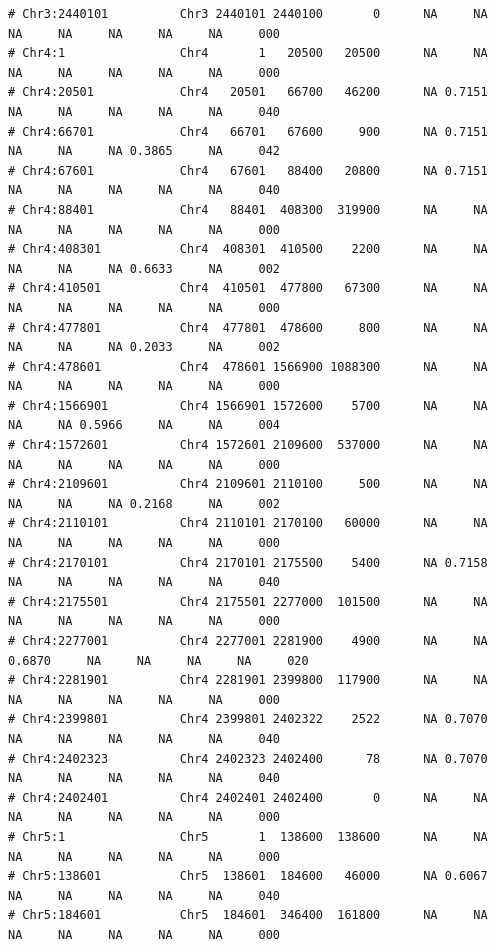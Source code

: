 \documentclass{article}\usepackage[]{graphicx}\usepackage[]{color}
\makeatletter
\newenvironment{kframe}{%
 \def\at@end@of@kframe{}%
 \ifinner\ifhmode%
  \def\at@end@of@kframe{\end{minipage}}%
  \begin{minipage}{\columnwidth}%
 \fi\fi%
 \def\FrameCommand##1{\hskip\@totalleftmargin \hskip-\fboxsep
 \colorbox{shadecolor}{##1}\hskip-\fboxsep
     \hskip-\linewidth \hskip-\@totalleftmargin \hskip\columnwidth}%
 \MakeFramed {\advance\hsize-\width
   \@totalleftmargin\z@ \linewidth\hsize
   \@setminipage}}%
 {\par\unskip\endMakeFramed%
 \at@end@of@kframe}
\newenvironment{knitrout}{}{} %
\makeatother
\begin{document}
\begin{knitrout}
\begin{kframe}
\begin{verbatim}
# Chr3:2440101          Chr3 2440101 2440100       0      NA     NA     NA     NA     NA     NA     NA     000
# Chr4:1                Chr4       1   20500   20500      NA     NA     NA     NA     NA     NA     NA     000
# Chr4:20501            Chr4   20501   66700   46200      NA 0.7151     NA     NA     NA     NA     NA     040
# Chr4:66701            Chr4   66701   67600     900      NA 0.7151     NA     NA     NA 0.3865     NA     042
# Chr4:67601            Chr4   67601   88400   20800      NA 0.7151     NA     NA     NA     NA     NA     040
# Chr4:88401            Chr4   88401  408300  319900      NA     NA     NA     NA     NA     NA     NA     000
# Chr4:408301           Chr4  408301  410500    2200      NA     NA     NA     NA     NA 0.6633     NA     002
# Chr4:410501           Chr4  410501  477800   67300      NA     NA     NA     NA     NA     NA     NA     000
# Chr4:477801           Chr4  477801  478600     800      NA     NA     NA     NA     NA 0.2033     NA     002
# Chr4:478601           Chr4  478601 1566900 1088300      NA     NA     NA     NA     NA     NA     NA     000
# Chr4:1566901          Chr4 1566901 1572600    5700      NA     NA     NA     NA 0.5966     NA     NA     004
# Chr4:1572601          Chr4 1572601 2109600  537000      NA     NA     NA     NA     NA     NA     NA     000
# Chr4:2109601          Chr4 2109601 2110100     500      NA     NA     NA     NA     NA 0.2168     NA     002
# Chr4:2110101          Chr4 2110101 2170100   60000      NA     NA     NA     NA     NA     NA     NA     000
# Chr4:2170101          Chr4 2170101 2175500    5400      NA 0.7158     NA     NA     NA     NA     NA     040
# Chr4:2175501          Chr4 2175501 2277000  101500      NA     NA     NA     NA     NA     NA     NA     000
# Chr4:2277001          Chr4 2277001 2281900    4900      NA     NA 0.6870     NA     NA     NA     NA     020
# Chr4:2281901          Chr4 2281901 2399800  117900      NA     NA     NA     NA     NA     NA     NA     000
# Chr4:2399801          Chr4 2399801 2402322    2522      NA 0.7070     NA     NA     NA     NA     NA     040
# Chr4:2402323          Chr4 2402323 2402400      78      NA 0.7070     NA     NA     NA     NA     NA     040
# Chr4:2402401          Chr4 2402401 2402400       0      NA     NA     NA     NA     NA     NA     NA     000
# Chr5:1                Chr5       1  138600  138600      NA     NA     NA     NA     NA     NA     NA     000
# Chr5:138601           Chr5  138601  184600   46000      NA 0.6067     NA     NA     NA     NA     NA     040
# Chr5:184601           Chr5  184601  346400  161800      NA     NA     NA     NA     NA     NA     NA     000

\end{verbatim}
\end{kframe}
\end{knitrout}
\end{document}
